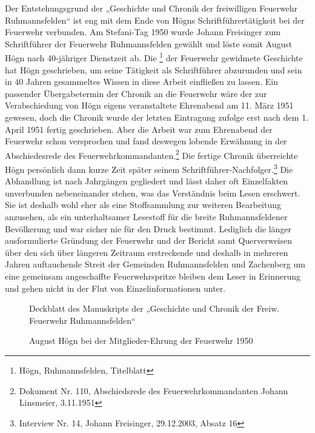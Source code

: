 Der Entstehungsgrund der „Geschichte und Chronik der freiwilligen
Feuerwehr Ruhmannsfelden“ ist eng mit dem Ende von Högns
Schriftführertätigkeit bei der Feuerwehr verbunden. Am Stefani-Tag 1950
wurde Johann Freisinger zum Schriftführer der Feuerwehr Ruhmannsfelden
gewählt und löste somit August Högn nach 40-jähriger Dienstzeit ab. Die
  \footnote{Högn,
Ruhmannsfelden, Titelblatt} der Feuerwehr gewidmete Geschichte hat Högn
geschrieben, um seine Tätigkeit als Schriftführer abzurunden und sein
in 40 Jahren gesammeltes Wissen in diese Arbeit einfließen zu lassen.
Ein passender Übergabetermin der Chronik an die Feuerwehr wäre der zur
Verabschiedung von Högn eigens veranstaltete Ehrenabend am 11. März
1951 gewesen, doch die Chronik wurde der letzten Eintragung zufolge
erst nach dem 1. April 1951 fertig geschrieben. Aber die Arbeit war zum
Ehrenabend der Feuerwehr schon versprochen und fand deswegen lobende
Erwähnung in der Abschiedesrede des Feuerwehrkommandanten.\footnote{
Dokument Nr. 110, Abschiedsrede des Feuerwehrkommandanten Johann
Linsmeier, 3.11.1951} Die fertige Chronik überreichte Högn persönlich
dann kurze Zeit später seinem Schriftführer-Nachfolger.\footnote{
Interview Nr. 14, Johann Freisinger, 29.12.2003, Absatz 16} Die
Abhandlung ist nach Jahrgängen gegliedert und lässt daher oft
Einzelfakten unverbunden nebeneinander stehen, was das Verständnis beim
Lesen erschwert. Sie ist deshalb wohl eher als eine Stoffsammlung zur
weiteren Bearbeitung anzusehen, als ein unterhaltsamer Lesestoff für
die breite Ruhmannsfeldener Bevölkerung und war sicher nie für den
Druck bestimmt. Lediglich die länger ausformulierte Gründung der
Feuerwehr und der Bericht samt Querverweisen über den sich über
längeren Zeitraum erstreckende und deshalb in mehreren Jahren
auftauchende Streit der Gemeinden Ruhmannsfelden und Zachenberg um eine
gemeinsam angeschaffte Feuerwehrspritze bleiben dem Leser in Erinnerung
und gehen nicht in der Flut von Einzelinformationen unter.

\begin{figure}
\caption{Deckblatt des Manuskripts der „Geschichte und Chronik der Freiw. Feuerwehr Ruhmannsfelden“}
\end{figure}

\begin{figure}
\caption{August Högn bei der Mitglieder-Ehrung der Feuerwehr 1950}
\end{figure}


